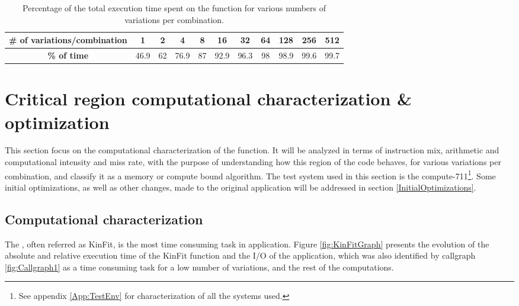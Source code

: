 \begin{table}[!htp]
	\begin{center}
		\begin{tabular}{|c|c|c|c|c|c|c|c|c|c|c|}
			\hline
			\textbf{# of variations/combination} & 1 & 2 & 4 & 8 & 16 & 32 & 64 & 128 & 256 & 512 \\ \hline
			\textbf{\% of time} & 46.9 & 62 & 76.9 & 87 & 92.9 & 96.3 & 98 & 98.9 & 99.6 & 99.7 \\ \hline
		\end{tabular}
		\caption{Percentage of the total execution time spent on the \ttDilepKinFit function for various numbers of variations per combination.}
		\label{tab:TempoKinFit}
	\end{center}
\end{table}

\section{Critical region computational characterization \& optimization}
\label{CriticalRegion}

This section focus on the computational characterization of the \ttDilepKinFit function. It will be analyzed in terms of instruction mix, arithmetic and computational intensity and miss rate, with the purpose of understanding how this region of the code behaves, for various variations per combination, and classify it as a memory or compute bound algorithm. The test system used in this section is the compute-711\footnote{See appendix \ref{App:TestEnv} for characterization of all the systems used.}. Some initial optimizations, as well as other changes, made to the original application will be addressed in section \ref{InitialOptimizations}.

\subsection{Computational characterization}
\label{ComputationalCharactrization}

The \ttDilepKinFit, often referred as KinFit, is the most time consuming task in \tth application. Figure \ref{fig:KinFitGraph} presents the evolution of the absolute and relative execution time of the KinFit function and the I/O of the application, which was also identified by callgraph \ref{fig:Callgraph1} as a time consuming task for a low number of variations, and the rest of the computations.


